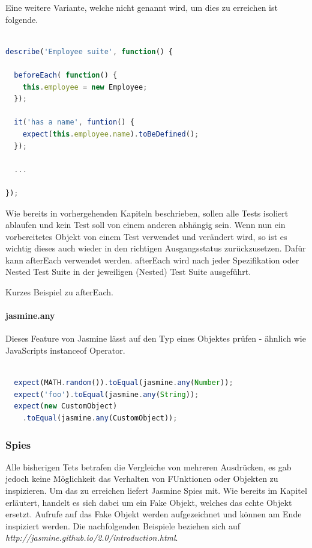 Eine weitere Variante, welche nicht genannt wird, um dies zu erreichen ist folgende.

\begin{lstlisting}[language=JavaScript]

describe('Employee suite', function() {

  beforeEach( function() {
    this.employee = new Employee;
  });

  it('has a name', funtion() {
    expect(this.employee.name).toBeDefined();
  });

  ...

});
\end{lstlisting}

Wie bereits in vorhergehenden Kapiteln beschrieben, sollen alle Tests isoliert ablaufen und kein Test soll von einem anderen abhängig sein. Wenn nun ein vorbereitetes Objekt von einem Test verwendet und verändert wird, so ist es wichtig dieses auch wieder in den richtigen Ausgangsstatus zurückzusetzen. Dafür kann afterEach verwendet werden. afterEach wird nach jeder Spezifikation oder Nested Test Suite in der jeweiligen (Nested) Test Suite ausgeführt.

Kurzes Beispiel zu afterEach.

\paragraph{jasmine.any}
Dieses Feature von Jasmine lässt auf den Typ eines Objektes prüfen - ähnlich wie JavaScripts instanceof Operator.
\begin{lstlisting}[language=JavaScript]

  expect(MATH.random()).toEqual(jasmine.any(Number));
  expect('foo').toEqual(jasmine.any(String));
  expect(new CustomObject)
    .toEqual(jasmine.any(CustomObject));

\end{lstlisting}


\subsubsection{Spies}
Alle bisherigen Tets betrafen die Vergleiche von mehreren Ausdrücken, es gab jedoch keine Möglichkeit das Verhalten von FUnktionen oder Objekten zu inspizieren. Um das zu erreichen liefert Jasmine Spies mit. Wie bereits im Kapitel  erläutert, handelt es sich dabei um ein Fake Objekt, welches das echte Objekt ersetzt. Aufrufe auf das Fake Objekt werden aufgezeichnet und können am Ende inspiziert werden. Die nachfolgenden Beispiele beziehen sich auf \textit{http://jasmine.github.io/2.0/introduction.html}.

